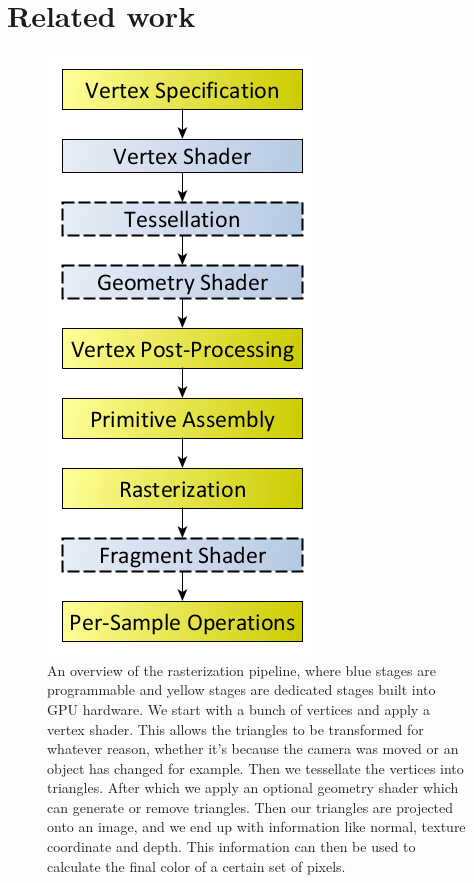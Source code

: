 \section{Related work} \label{related_work}

\begin{figure}
    \centering
    \includegraphics[width=0.5\linewidth]{figures/rasterization_pipeline.png}
    \caption{An overview of the rasterization pipeline, where blue stages are programmable and yellow stages are dedicated stages built into GPU hardware. We start with a bunch of vertices and apply a vertex shader. This allows the triangles to be transformed for whatever reason, whether it's because the camera was moved or an object has changed for example. Then we tessellate the vertices into triangles. After which we apply an optional geometry shader which can generate or remove triangles. Then our triangles are projected onto an image, and we end up with information like normal, texture coordinate and depth. This information can then be used to calculate the final color of a certain set of pixels. \cite{RasterPipeline}}
    \label{fig:rasterization_pipeline}
\end{figure}


